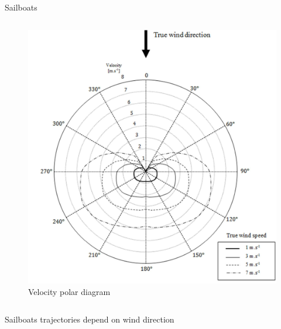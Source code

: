 \documentclass[10pt,xcolor={table,dvipsnames},t]{beamer}
\begin{document}
\begin{frame}{Sailboats}
\begin{columns}
\begin{figure}
    \includegraphics[width=\linewidth]{documents/figures/alves_vpp.png}
    \caption{Velocity polar diagram \cite{Alves2010}}
    \label{fig:alves_velocity}
\end{figure}
\end{columns}
\centerline{Sailboats trajectories depend on wind direction}
\end{frame}
\end{document}
